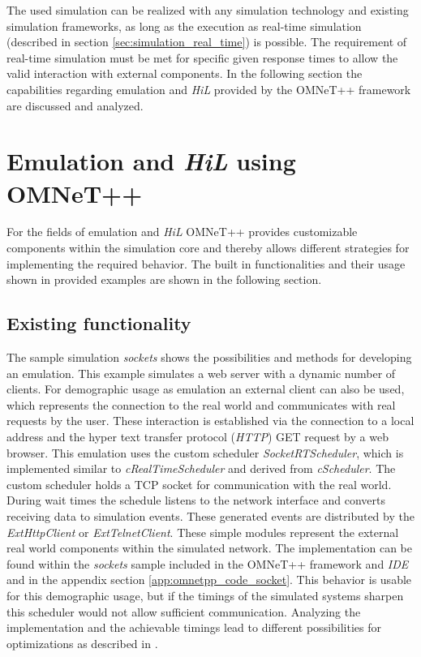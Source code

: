 The used simulation can be realized with any simulation technology and existing simulation frameworks, as long as the execution as real-time simulation (described in section \ref{sec:simulation_real_time}) is possible.
The requirement of real-time simulation must be met for specific given response times to allow the valid interaction with external components.
In the following section the capabilities regarding emulation and \emph{HiL} provided by the OMNeT++ framework are discussed and analyzed.

\section{Emulation and \emph{HiL} using OMNeT++}
\label{sec:emulation_omnet}
For the fields of emulation and \emph{HiL} OMNeT++ provides customizable components within the simulation core and thereby allows different strategies for implementing the required behavior.
The built in functionalities and their usage shown in provided examples are shown in the following section.

\subsection{Existing functionality}
\label{sec:emulation_omnet_existing}

The sample simulation \emph{sockets} shows the possibilities and methods for developing an emulation.
This example simulates a web server with a dynamic number of clients.
For demographic usage as emulation an external client can also be used, which represents the connection to the real world and communicates with real requests by the user.
These interaction is established via the connection to a local address and the hyper text transfer protocol (\emph{HTTP}) GET request by a web browser.
This emulation uses the custom scheduler \emph{SocketRTScheduler}, which is implemented similar to \emph{cRealTimeScheduler} and derived from \emph{cScheduler}. \cite{omnet_api}
The custom scheduler holds a TCP socket for communication with the real world.
During wait times the schedule listens to the network interface and converts receiving data to simulation events.
These generated events are distributed by the \emph{ExtHttpClient} or \emph{ExtTelnetClient}.
These simple modules represent the external real world components within the simulated network.
The implementation can be found within the \emph{sockets} sample included in the OMNeT++ framework and \emph{IDE} and in the appendix section \ref{app:omnetpp_code_socket}.
This behavior is usable for this demographic usage, but if the timings of the simulated systems sharpen this scheduler would not allow sufficient communication.
Analyzing the implementation and the achievable timings lead to different possibilities for optimizations as described in \cite{scussel_improvements_2015}.

